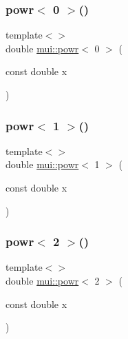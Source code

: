 \mbox{\label{namespacemui_a0d4458e7402b6889e19947f35f781c1c}} 
\subsubsection{\texorpdfstring{powr$<$ 0 $>$()}{powr< 0 >()}}
{\footnotesize\ttfamily template$<$$>$ \\
double \hyperlink{namespacemui_ab915ac09900cc1e6986f3f054363016c}{mui\+::powr}$<$ 0 $>$ (\begin{DoxyParamCaption}\item[{const double}]{x }\end{DoxyParamCaption})\hspace{0.3cm}{\ttfamily [inline]}}

\mbox{\label{namespacemui_a5841c790c9b498447903fa429451ee4d}} 
\subsubsection{\texorpdfstring{powr$<$ 1 $>$()}{powr< 1 >()}}
{\footnotesize\ttfamily template$<$$>$ \\
double \hyperlink{namespacemui_ab915ac09900cc1e6986f3f054363016c}{mui\+::powr}$<$ 1 $>$ (\begin{DoxyParamCaption}\item[{const double}]{x }\end{DoxyParamCaption})\hspace{0.3cm}{\ttfamily [inline]}}

\mbox{\label{namespacemui_a5f1a0ebdb048dd8821acf0f391d036e6}} 
\subsubsection{\texorpdfstring{powr$<$ 2 $>$()}{powr< 2 >()}}
{\footnotesize\ttfamily template$<$$>$ \\
double \hyperlink{namespacemui_ab915ac09900cc1e6986f3f054363016c}{mui\+::powr}$<$ 2 $>$ (\begin{DoxyParamCaption}\item[{const double}]{x }\end{DoxyParamCaption})\hspace{0.3cm}{\ttfamily [inline]}}

